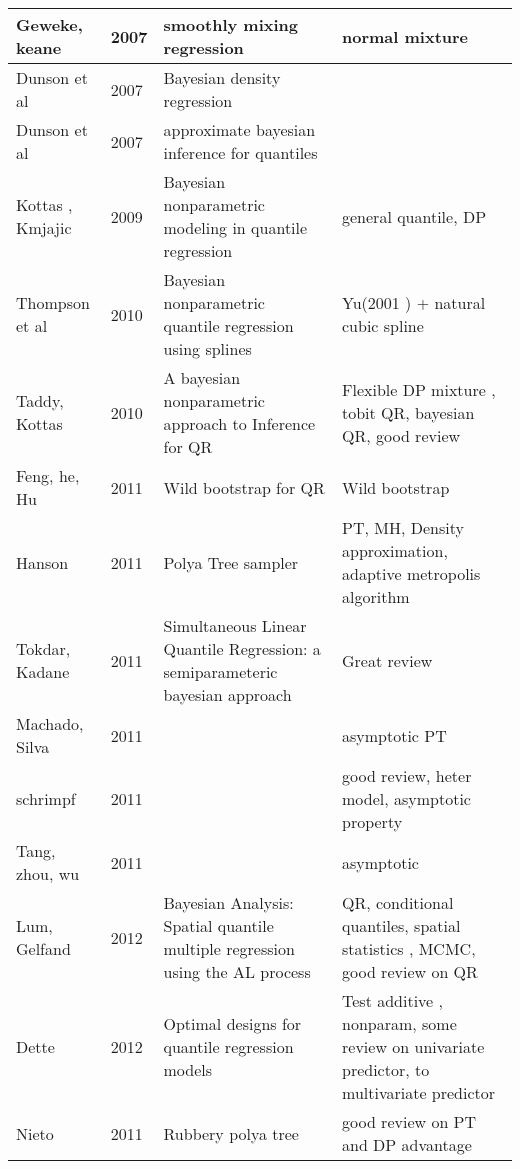 \documentclass{article}
\begin{document}
\begin{table}[htbp]
\begin{tabular}[tb]{m{4cm}|m{1cm}|m{5cm}|m{5cm}}
\hline
Geweke, keane & 2007 & smoothly mixing regression & normal mixture \\
\hline
Dunson et al & 2007 & Bayesian density regression & \\
\hline  
Dunson et al & 2007 & approximate bayesian inference for quantiles & \\
Kottas , Kmjajic & 2009 & Bayesian nonparametric modeling in quantile
regression & general quantile, DP \\
\hline
Thompson et al & 2010 & Bayesian nonparametric quantile regression
using splines & Yu(2001 ) + natural cubic spline \\
\hline
Taddy, Kottas & 2010 & A bayesian nonparametric approach to Inference
for QR & Flexible DP mixture , tobit QR, bayesian QR, good review \\
\hline
Feng, he, Hu & 2011 & Wild bootstrap for QR & Wild bootstrap \\
\hline
Hanson & 2011 & Polya Tree sampler & PT, MH, Density approximation,
adaptive metropolis algorithm \\
\hline 
Tokdar, Kadane & 2011 & Simultaneous Linear Quantile Regression: a
semiparameteric bayesian approach& Great review \\
\hline 
Machado, Silva & 2011 && asymptotic PT \\
\hline 
schrimpf & 2011 && good review, heter model, asymptotic property \\
\hline 
Tang, zhou, wu & 2011 && asymptotic  \\
\hline
Lum, Gelfand & 2012 & Bayesian Analysis: Spatial quantile multiple
regression using the AL process & QR, conditional quantiles, spatial
statistics , MCMC, good review on QR \\
\hline
Dette & 2012 & Optimal designs for quantile regression models & Test
additive , nonparam, some review on univariate predictor, to
multivariate predictor \\
\hline
Nieto & 2011 & Rubbery polya tree &  good review on PT and DP advantage\\
\hline
\end{tabular}

\end{table}
\end{document}
